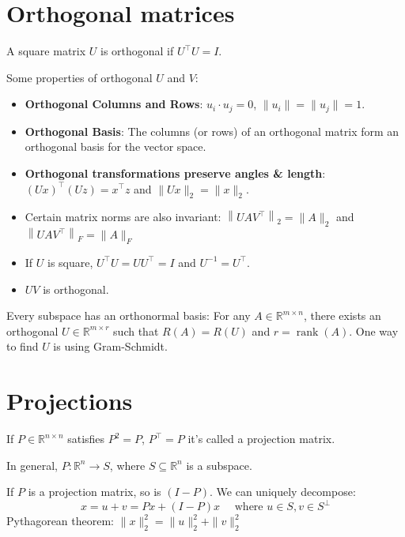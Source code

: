 \documentclass[14pt]{article}
\theoremstyle{definition}
\theoremstyle{remark}
\begin{document}
\begin{multicols}{2}

    \section{Orthogonal matrices}
    A square matrix $U$ is orthogonal if $U^{\top} U=I$.

    Some properties of orthogonal $U$ and $V$:
    \begin{itemize}
        \item \textbf{Orthogonal Columns and Rows}: $u_i\cdot u_j = 0$, $\|u_i\|=\|u_j\|=1$.

        \item \textbf{Orthogonal Basis}: The columns (or rows) of an orthogonal matrix form an orthogonal basis for the vector space.
        \item \textbf{Orthogonal transformations preserve angles \& length}: $(U x)^{\top}(U z)=x^{\top} z$ and $\|U x\|_{2}=\|x\|_{2}$.

        \item Certain matrix norms are also invariant: $\left\|U A V^{\top}\right\|_{2}=\|A\|_{2}$ and $\left\|U A V^{\top}\right\|_{F}=\|A\|_{F}$

        \item If $U$ is square, $U^{\top} U=U U^{\top}=I$ and $U^{-1}=U^{\top}$.

        \item $U V$ is orthogonal.

    \end{itemize}

    Every subspace has an orthonormal basis: For any $A \in \mathbb{R}^{m \times n}$, there exists an orthogonal $U \in \mathbb{R}^{m \times r}$ such that $R(A)=R(U)$ and $r=\operatorname{rank}(A)$. One way to find $U$ is using Gram-Schmidt.


    \columnbreak


    \section{Projections}
    If $P \in \mathbb{R}^{n \times n}$ satisfies $P^{2}=P$, $P^\top = P$ it's called a projection matrix.

    In general, $P: \mathbb{R}^{n} \rightarrow S$, where $S \subseteq \mathbb{R}^{n}$ is a subspace.

    If $P$ is a projection matrix, so is $(I-P)$. We can uniquely decompose:
    \[
        x=u+v = P x + (I-P) x \quad  \text { where } u \in S, v \in S^{\perp}
    \]
    Pythagorean theorem: $\|x\|_{2}^{2}=\|u\|_{2}^{2}+\|v\|_{2}^{2}$


\end{multicols}
\end{document}
